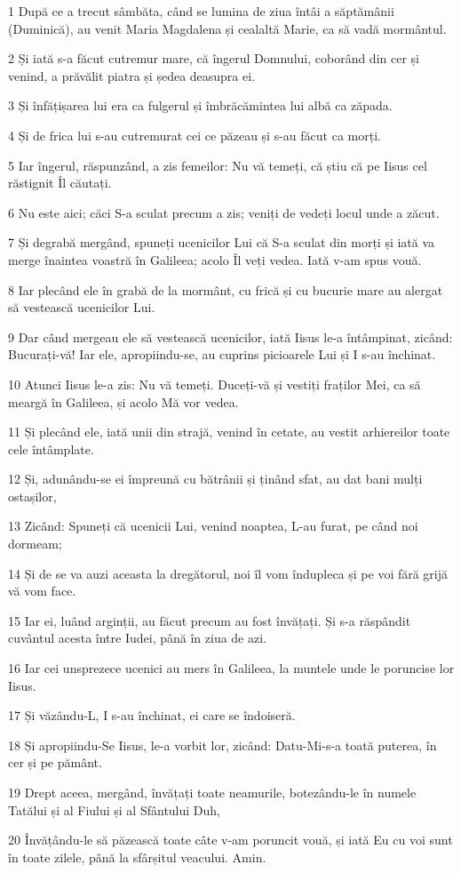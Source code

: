 \par 1 După ce a trecut sâmbăta, când se lumina de ziua întâi a săptămânii (Duminică), au venit Maria Magdalena și cealaltă Marie, ca să vadă mormântul.
\par 2 Și iată s-a făcut cutremur mare, că îngerul Domnului, coborând din cer și venind, a prăvălit piatra și ședea deasupra ei.
\par 3 Și înfățișarea lui era ca fulgerul și îmbrăcămintea lui albă ca zăpada.
\par 4 Și de frica lui s-au cutremurat cei ce păzeau și s-au făcut ca morți.
\par 5 Iar îngerul, răspunzând, a zis femeilor: Nu vă temeți, că știu că pe Iisus cel răstignit Îl căutați.
\par 6 Nu este aici; căci S-a sculat precum a zis; veniți de vedeți locul unde a zăcut.
\par 7 Și degrabă mergând, spuneți ucenicilor Lui că S-a sculat din morți și iată va merge înaintea voastră în Galileea; acolo Îl veți vedea. Iată v-am spus vouă.
\par 8 Iar plecând ele în grabă de la mormânt, cu frică și cu bucurie mare au alergat să vestească ucenicilor Lui.
\par 9 Dar când mergeau ele să vestească ucenicilor, iată Iisus le-a întâmpinat, zicând: Bucurați-vă! Iar ele, apropiindu-se, au cuprins picioarele Lui și I s-au închinat.
\par 10 Atunci Iisus le-a zis: Nu vă temeți. Duceți-vă și vestiți fraților Mei, ca să meargă în Galileea, și acolo Mă vor vedea.
\par 11 Și plecând ele, iată unii din strajă, venind în cetate, au vestit arhiereilor toate cele întâmplate.
\par 12 Și, adunându-se ei împreună cu bătrânii și ținând sfat, au dat bani mulți ostașilor,
\par 13 Zicând: Spuneți că ucenicii Lui, venind noaptea, L-au furat, pe când noi dormeam;
\par 14 Și de se va auzi aceasta la dregătorul, noi îl vom îndupleca și pe voi fără grijă vă vom face.
\par 15 Iar ei, luând arginții, au făcut precum au fost învățați. Și s-a răspândit cuvântul acesta între Iudei, până în ziua de azi.
\par 16 Iar cei unsprezece ucenici au mers în Galileea, la muntele unde le poruncise lor Iisus.
\par 17 Și văzându-L, I s-au închinat, ei care se îndoiseră.
\par 18 Și apropiindu-Se Iisus, le-a vorbit lor, zicând: Datu-Mi-s-a toată puterea, în cer și pe pământ.
\par 19 Drept aceea, mergând, învățați toate neamurile, botezându-le în numele  Tatălui și al Fiului și al Sfântului Duh,
\par 20 Învățându-le să păzească toate câte v-am poruncit vouă, și iată Eu cu voi sunt în toate zilele, până la sfârșitul veacului. Amin.


